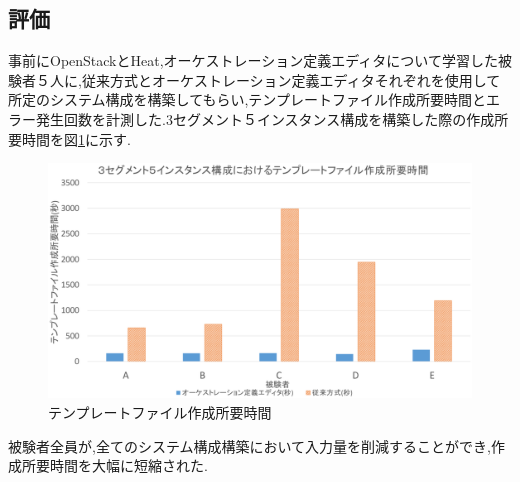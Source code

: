 \documentclass[a4j]{jarticle}
\begin{document}
\begin{Abstract}
 \section{評価}
 事前にOpenStackとHeat,オーケストレーション定義エディタについて学習した被験者５人に,従来方式とオーケストレーション定義エディタそれぞれを使用して所定のシステム構成を構築してもらい,テンプレートファイル作成所要時間とエラー発生回数を計測した.3セグメント５インスタンス構成を構築した際の作成所要時間を図\ref{graf:2}に示す.
 \begin{figure}[H]
 	\begin{center}
 		\includegraphics[scale=0.265]{Document/Abstract_Comparison.eps}
 		\caption{テンプレートファイル作成所要時間}
 		\label{graf:2}
 	\end{center}
 \end{figure}
 被験者全員が,全てのシステム構成構築において入力量を削減することができ,作成所要時間を大幅に短縮された.
 

\end{Abstract}
\end{document}
